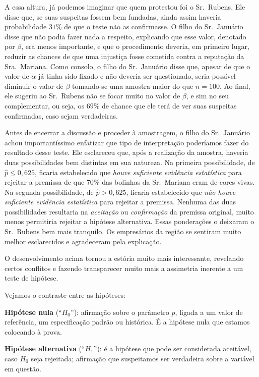 \documentclass[12pt,a4paper]{article}
\theoremstyle{plain}
\theoremstyle{definition}
\theoremstyle{remark}
\newenvironment{example}{\pushQED{\qed}\renewcommand{\qedsymbol}{\scriptsize$\triangle$}\examplex}{\popQED\endexamplex}
\begin{document}
\begin{example}
A essa altura, já podemos imaginar que quem protestou foi o Sr.~Rubens.
Ele disse que, se suas suspeitas fossem bem fundadas, ainda assim haveria probabilidade $31\%$ de que o teste não as confirmasse.
O filho do Sr.~Januário disse que não podia fazer nada a respeito, explicando que esse valor, denotado por $\beta$, era menos importante, e que o procedimento deveria, em primeiro lugar, reduzir as chances de que uma injustiça fosse cometida contra a reputação da Sra.~Mariana.
Como consolo, o filho do Sr.~Januário disse que, apesar de que o valor de $\alpha$ já tinha sido fixado e não deveria ser questionado, seria possível diminuir o valor de $\beta$ tomando-se uma amostra maior do que $n=100$.
Ao final, ele sugeriu ao Sr.~Rubens não se focar muito no valor de $\beta$, e sim no seu complementar, ou seja, os $69\%$ de chance que ele terá de ver suas suspeitas confirmadas, caso sejam verdadeiras.

Antes de encerrar a discussão e proceder à amostragem, o filho do Sr.~Januário achou importantíssimo enfatizar que tipo de interpretação poderíamos fazer do resultado desse teste.
Ele esclareceu que, após a realização da amostra, haveria duas possibilidades bem distintas em sua natureza.
Na primeira possibilidade, de $\hat{p} \leq 0,625$, ficaria estabelecido que \emph{houve suficiente evidência estatística} para rejeitar a premissa de que $70\%$ das bolinhas da Sr.~Mariana eram de cores vivas.
Na segunda possibilidade, de $\hat{p} > 0,625$, ficaria estabelecido que \emph{não houve suficiente evidência estatística} para rejeitar a premissa.
Nenhuma das duas possibilidades resultaria na \emph{aceitação} ou \emph{confirmação} da premissa original, muito menos permitiria rejeitar a hipótese alternativa.
Essas ponderações o deixaram o Sr.~Rubens bem mais tranquilo.
Os empresários da região se sentiram muito melhor esclarecidos e agradeceram pela explicação.
\end{example}

O desenvolvimento acima tornou a estória muito mais interessante, revelando certos conflitos e fazendo transparecer muito mais a assimetria inerente a um teste de hipótese.

Vejamos o contraste entre as hipóteses:

\textbf{Hipótese nula} (``$H_0$''): afirmação sobre o parâmetro $p$, ligada a um valor de referência, um especificação padrão ou histórica. É a hipótese nula que estamos colocando à prova.

\textbf{Hipótese alternativa}  (``$H_1$''): é a hipótese que pode ser considerada aceitável, caso $H_0$ seja rejeitada; afirmação que suspeitamos ser verdadeira sobre a variável em questão.
\end{document}
